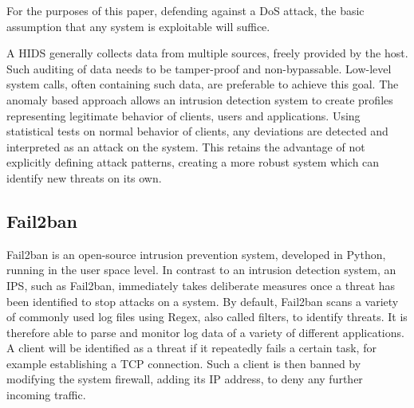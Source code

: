 For the purposes of this paper, defending against a \ac{DoS} attack, the basic assumption that any system is exploitable will suffice.

A \ac{HIDS} generally collects data from multiple sources, freely provided by the host.
Such auditing of data needs to be tamper-proof and non-bypassable.
Low-level system calls, often containing such data, are preferable to achieve this goal.
The anomaly based approach allows an intrusion detection system to create profiles representing legitimate behavior of clients, users and applications.
Using statistical tests on normal behavior of clients, any deviations are detected and interpreted as an attack on the system.
This retains the advantage of not explicitly defining attack patterns, creating a more robust system which can identify new threats on its own.\cite{HIDPS}

\subsection{Fail2ban}
Fail2ban is an open-source intrusion prevention system, developed in Python, running in the user space level.
In contrast to an intrusion detection system, an \ac{IPS}, such as Fail2ban, immediately takes deliberate measures once a threat has been identified to stop attacks on a system.
By default, Fail2ban scans a variety of commonly used log files using \ac{Regex}, also called filters, to identify threats.
It is therefore able to parse and monitor log data of a variety of different applications.
A client will be identified as a threat if it repeatedly fails a certain task, for example establishing a \ac{TCP} connection.
Such a client is then banned by modifying the system firewall, adding its \ac{IP} address, to deny any further incoming traffic.\cite{git:fail2ban}

